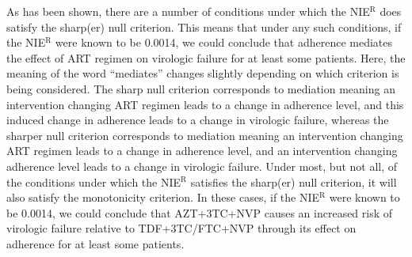 \documentclass[12pt]{article}
\begin{document}
As has been shown, there are a number of conditions under which the NIE$^{\text{R}}$ %
does satisfy the sharp(er) null criterion. This means that under any such conditions, if the NIE$^{\text{R}}$ were known to be 0.0014, we could conclude that adherence mediates the effect of ART regimen on virologic failure for at least some patients. Here, the meaning of the word ``mediates'' changes slightly depending on which criterion is being considered. The sharp null criterion corresponds to mediation meaning an intervention changing ART regimen leads to a change in adherence level, and this induced change in adherence leads to a change in virologic failure, whereas the sharper null criterion corresponds to mediation meaning an intervention changing ART regimen leads to a change in adherence level, and an intervention changing adherence level leads to a change in virologic failure. Under most, but not all, of the conditions under which the NIE$^{\text{R}}$ satisfies the sharp(er) null criterion, it will also satisfy the monotonicity criterion. In these cases, if the NIE$^{\text{R}}$ were known to be 0.0014, we could conclude that AZT+3TC+NVP causes an increased risk of virologic failure relative to TDF+3TC/FTC+NVP through its effect on adherence for at least some patients. 
\end{document}
